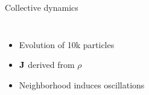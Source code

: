 \documentclass[aspectratio=169, usenames, dvipsnames]{beamer}
\begin{document}
\begin{frame}{Collective dynamics}
  \begin{columns}
      \begin{itemize}
        \item Evolution of 10k particles
        \item $\vb{J}$ derived from $\rho$
        \item Neighborhood induces oscillations
      \end{itemize}
      \begin{center}
        
      \end{center}
  \end{columns}
\end{frame}
\end{document}
